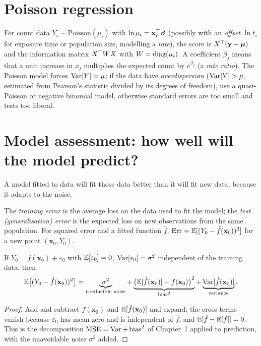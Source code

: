 \section{Poisson regression}

For count data $Y_i\sim\mathrm{Poisson}(\mu_i)$ with $\ln\mu_i=\mathbf{x}_i^{\top}\boldsymbol\beta$ (possibly with an \emph{offset} $\ln t_i$ for exposure time or population size, modelling a \emph{rate}), the score is $X^{\top}(\mathbf{y}-\boldsymbol\mu)$ and the information matrix $X^{\top} WX$ with $W=\operatorname{diag}(\mu_i)$. A coefficient $\beta_j$ means that a unit increase in $x_j$ multiplies the expected count by $e^{\beta_j}$ (a \emph{rate ratio}). The Poisson model forces $\operatorname{Var}[Y]=\mu$; if the data have \emph{overdispersion} ($\operatorname{Var}[Y]>\mu$, estimated from Pearson's statistic divided by its degrees of freedom), use a quasi-Poisson or negative binomial model, otherwise standard errors are too small and tests too liberal.

\section{Model assessment: how well will the model predict?}

A model fitted to data will fit those data better than it will fit new data, because it adapts to the noise.

\begin{definition}
The \emph{training error} is the average loss on the data used to fit the model; the \emph{test (generalisation) error} is the expected loss on new observations from the same population. For squared error and a fitted function $\hat{f}$, $\mathrm{Err}=\mathbb{E}[(Y_0-\hat{f}(\mathbf{x}_0))^2]$ for a new point $(\mathbf{x}_0,Y_0)$.
\end{definition}

\begin{theorem}\label{thm:biasvar-pred}
If $Y_0=f(\mathbf{x}_0)+\varepsilon_0$ with $\mathbb{E}[\varepsilon_0]=0$, $\operatorname{Var}[\varepsilon_0]=\sigma^2$ independent of the training data, then
\[ \mathbb{E}\big[(Y_0-\hat{f}(\mathbf{x}_0))^2\big]=\underbrace{\sigma^2}_{\text{irreducible noise}}+\underbrace{\big(\mathbb{E}[\hat{f}(\mathbf{x}_0)]-f(\mathbf{x}_0)\big)^2}_{\text{bias}^2}+\underbrace{\operatorname{Var}[\hat{f}(\mathbf{x}_0)]}_{\text{variance}}. \]
\end{theorem}

\begin{proof}
Add and subtract $f(\mathbf{x}_0)$ and $\mathbb{E}[\hat{f}(\mathbf{x}_0)]$ and expand; the cross terms vanish because $\varepsilon_0$ has mean zero and is independent of $\hat{f}$, and $\mathbb{E}[\hat{f}-\mathbb{E}[\hat{f}]]=0$. This is the decomposition $\operatorname{MSE}=\operatorname{Var}+\operatorname{bias}^2$ of Chapter~1 applied to prediction, with the unavoidable noise $\sigma^2$ added.
\end{proof}

